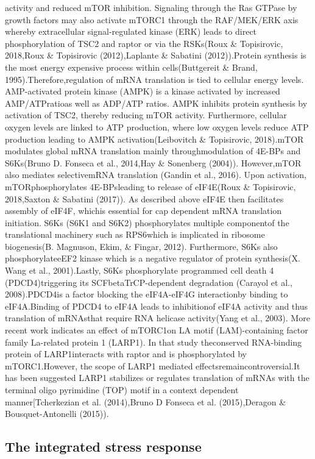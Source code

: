 \documentclass[12pt,openany]{book}
\begin{document}
activity and reduced mTOR inhibition. Signaling through the Ras GTPase
by growth factors may also activate mTORC1 through the RAF/MEK/ERK axis
whereby extracellular signal-regulated kinase (ERK) leads to direct
phosphorylation of TSC2 and raptor or via the RSKs(Roux \& Topisirovic,
2018,Roux \& Topisirovic (2012),Laplante \& Sabatini (2012)).Protein
synthesis is the most energy expensive process within cells(Buttgereit
\& Brand, 1995).Therefore,regulation of mRNA translation is tied to
cellular energy levels. AMP-activated protein kinase (AMPK) is a kinase
activated by increased AMP/ATPratioas well as ADP/ATP ratios. AMPK
inhibits protein synthesis by activation of TSC2, thereby reducing mTOR
activity. Furthermore, cellular oxygen levels are linked to ATP
production, where low oxygen levels reduce ATP production leading to
AMPK activation(Leibovitch \& Topisirovic, 2018).mTOR modulates global
mRNA translation mainly throughmodulation of 4E-BPs and S6Ks(Bruno D.
Fonseca et al., 2014,Hay \& Sonenberg (2004)). However,mTOR also
mediates selectivemRNA translation (Gandin et al., 2016). Upon
activation, mTORphosphorylates 4E-BPsleading to release of eIF4E(Roux \&
Topisirovic, 2018,Saxton \& Sabatini (2017)). As described above eIF4E
then facilitates assembly of eIF4F, whichis essential for cap dependent
mRNA translation initiation. S6Ks (S6K1 and S6K2) phosphorylates
multiple componentof the translational machinery such as RPS6which is
implicated in ribosome biogenesis(B. Magnuson, Ekim, \& Fingar, 2012).
Furthermore, S6Ks also phosphorylateeEF2 kinase which is a negative
regulator of protein synthesis(X. Wang et al., 2001).Lastly, S6Ks
phosphorylate programmed cell death 4 (PDCD4)triggering its
SCFbetaTrCP-dependent degradation (Carayol et al., 2008).PDCD4is a
factor blocking the eIF4A-eIF4G interactionby binding to eIF4A.Binding
of PDCD4 to eIF4A leads to inhibitionof eIF4A activity and thus
translation of mRNAsthat require RNA helicase activity(Yang et al.,
2003). More recent work indicates an effect of mTORC1on LA motif
(LAM)-containing factor family La-related protein 1 (LARP1). In that
study theconserved RNA-binding protein of LARP1interacts with raptor and
is phosphorylated by mTORC1.However, the scope of LARP1 mediated
effectsremaincontroversial.It has been suggested LARP1 stabilizes or
regulates translation of mRNAs with the terminal oligo pyrimidine (TOP)
motif in a context dependent manner{[}Tcherkezian et al. (2014),Bruno D
Fonseca et al. (2015),Deragon \& Bousquet-Antonelli (2015)).

\subsection{The integrated stress response}
\end{document}

